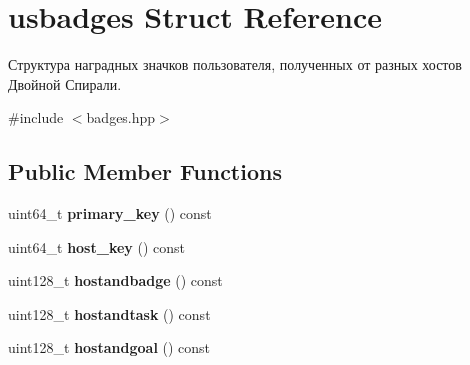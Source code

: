 \hypertarget{structusbadges}{}\section{usbadges Struct Reference}
\label{structusbadges}


Структура наградных значков пользователя, полученных от разных хостов Двойной Спирали.  




{\ttfamily \#include $<$badges.\+hpp$>$}

\subsection*{Public Member Functions}
\begin{DoxyCompactItemize}
\item 
\mbox{\label{structusbadges_aa4163106e97fb9771586b4c8677df30d}} 
uint64\+\_\+t {\bfseries primary\+\_\+key} () const
\item 
\mbox{\label{structusbadges_a042bdd252b5cf0b75f9c4decc0e6fda5}} 
uint64\+\_\+t {\bfseries host\+\_\+key} () const
\item 
\mbox{\label{structusbadges_a7a6853ea93075e7c8bfc5d511e327b77}} 
uint128\+\_\+t {\bfseries hostandbadge} () const
\item 
\mbox{\label{structusbadges_af2c4980c5cab23010df77daba94da40d}} 
uint128\+\_\+t {\bfseries hostandtask} () const
\item 
\mbox{\label{structusbadges_a4228dc6da303415539b37f62b3f50065}} 
uint128\+\_\+t {\bfseries hostandgoal} () const
\end{DoxyCompactItemize}
